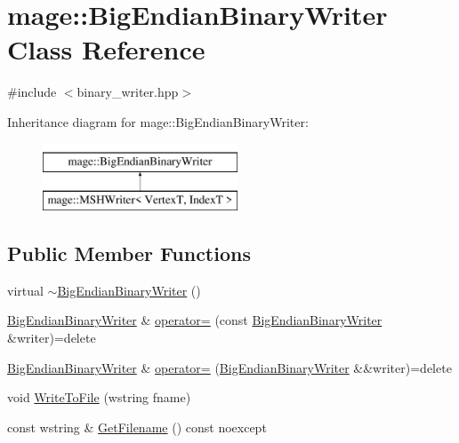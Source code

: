 \hypertarget{classmage_1_1_big_endian_binary_writer}{}\section{mage\+:\+:Big\+Endian\+Binary\+Writer Class Reference}
\label{classmage_1_1_big_endian_binary_writer}


{\ttfamily \#include $<$binary\+\_\+writer.\+hpp$>$}

Inheritance diagram for mage\+:\+:Big\+Endian\+Binary\+Writer\+:\begin{figure}[H]
\begin{center}
\leavevmode
\includegraphics[height=2.000000cm]{classmage_1_1_big_endian_binary_writer}
\end{center}
\end{figure}
\subsection*{Public Member Functions}
\begin{DoxyCompactItemize}
\item 
virtual \hyperlink{classmage_1_1_big_endian_binary_writer_ab717bcbfc15ba4a1cb25eeb564e120b8}{$\sim$\+Big\+Endian\+Binary\+Writer} ()
\item 
\hyperlink{classmage_1_1_big_endian_binary_writer}{Big\+Endian\+Binary\+Writer} \& \hyperlink{classmage_1_1_big_endian_binary_writer_ae574f7d0b630890256996c52818ba633}{operator=} (const \hyperlink{classmage_1_1_big_endian_binary_writer}{Big\+Endian\+Binary\+Writer} \&writer)=delete
\item 
\hyperlink{classmage_1_1_big_endian_binary_writer}{Big\+Endian\+Binary\+Writer} \& \hyperlink{classmage_1_1_big_endian_binary_writer_a92b57976cca0ff1859a487a1fe238211}{operator=} (\hyperlink{classmage_1_1_big_endian_binary_writer}{Big\+Endian\+Binary\+Writer} \&\&writer)=delete
\item 
void \hyperlink{classmage_1_1_big_endian_binary_writer_a3a49f78f308a0827f4a99150ad49d7c1}{Write\+To\+File} (wstring fname)
\item 
const wstring \& \hyperlink{classmage_1_1_big_endian_binary_writer_a61a80be19c7b59ff5803e51401e8f646}{Get\+Filename} () const noexcept
\end{DoxyCompactItemize}
